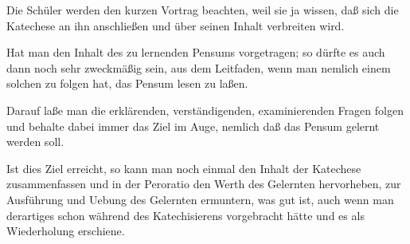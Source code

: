 Die Schüler werden den kurzen Vortrag beachten, weil sie ja wissen, daß sich die Katechese an ihn anschließen und über seinen Inhalt verbreiten wird.

Hat man den Inhalt des zu lernenden Pensums vorgetragen; so dürfte es auch dann noch sehr zweckmäßig sein, aus dem Leitfaden, wenn man nemlich einem solchen zu folgen hat, das Pensum lesen zu laßen.

Darauf laße man die erklärenden, verständigenden, examinierenden Fragen folgen und behalte dabei immer das Ziel im Auge, nemlich daß das Pensum gelernt werden soll.

Ist dies Ziel erreicht, so kann man noch einmal den Inhalt der Katechese zusammenfassen und in der Peroratio den Werth des Gelernten hervorheben, zur Ausführung und Uebung des Gelernten ermuntern, was gut ist, auch wenn man derartiges schon während des Katechisierens vorgebracht hätte und es als Wiederholung erschiene.

